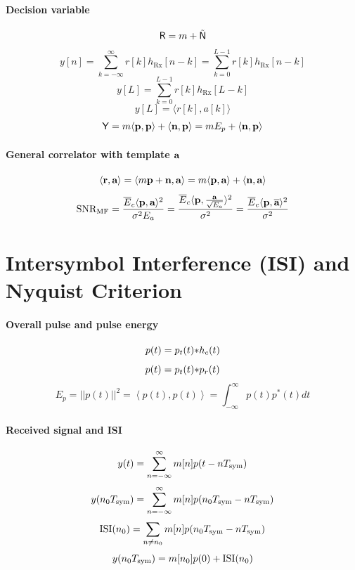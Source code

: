 \paragraph{Decision variable}
\[{\mathsf R} = m + \tilde {{\mathsf N}}\]
\[y[n]=\sum_{k=-\infty}^\infty r[k] h_{\textrm{Rx}}[n-k] = \sum_{k=0}^{L-1} r[k] h_{\textrm{Rx}}[n-k]\]
\begin{equation}
y[L]= \sum_{k=0}^{L-1} r[k] h_{\textrm{Rx}}[L-k]
\label{eq:mfout}
\end{equation}
\[
y[L]= \langle r[k],a[k]\rangle
\]
\begin{equation}
{\mathsf Y} = m\langle{\textbf p},{\textbf p} \rangle  + \langle{\textbf n},{\textbf p} \rangle  = m E_p + \langle{\textbf n},{\textbf p} \rangle
\label{eq:mfout2}
\end{equation}

\paragraph{General correlator with template ${\textbf a}$}
\begin{equation}
\langle{\textbf r},{\textbf a} \rangle  = \langle m {\textbf p} + {\textbf n}, {\textbf a} \rangle  = m\langle{\textbf p},{\textbf a} \rangle  + \langle{\textbf n},{\textbf a} \rangle
\label{eq:mfparcels}
\end{equation}
\[
{\textrm{SNR}}_{\textrm{MF}} = \frac{\overline E_c \langle{\textbf p},{\textbf a} \rangle ^2}{\sigma^2 E_a} = \frac{\overline E_c\langle{\textbf p},\frac{{\textbf a}}{\sqrt{E_a}} \rangle ^2}{\sigma^2} =
\frac{\overline E_c\langle{\textbf p},\overline {{\textbf a}} \rangle ^2}{\sigma^2}
\]

\section*{Intersymbol Interference (ISI) and Nyquist Criterion}

\paragraph{Overall pulse and pulse energy}
\begin{equation}
p(t) = p_t(t) {\ast} h_c(t)
\label{eq:overallPulse}
\end{equation}
\begin{equation}
p(t) = p_t(t) {\ast} p_r(t)
\label{eq:pulseWithEqualizedChannel}
\end{equation}
\begin{equation}
E_p = ||p(t)||^2 = \left< p(t),p(t) \right> = \int_{-\infty}^{\infty} p(t)p^*(t) dt
\end{equation}

\paragraph{Received signal and ISI}
\[
y(t) = \sum_{n=-\infty}^{\infty} m[n] p(t-n {T_{\textrm{sym}}})
\]
\[
y(n_0 {T_{\textrm{sym}}}) = \sum_{n=-\infty}^{\infty} m[n] p(n_0 {T_{\textrm{sym}}} -n {T_{\textrm{sym}}})
\]
\begin{equation}
\textrm{ISI}{(n_0)} = \sum_{n \ne n_0} m[n] p(n_0 {T_{\textrm{sym}}} -n {T_{\textrm{sym}}})
\label{eq:isi_pam}
\end{equation}
\[
y(n_0 {T_{\textrm{sym}}}) = m[n_0]p(0) + \textrm{ISI}{(n_0)}
\]

